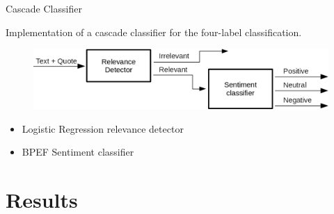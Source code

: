 \documentclass{beamer}
\begin{document}
	\begin{frame}{Cascade Classifier}
		
		Implementation of a cascade classifier for the four-label classification.
		
		\begin{figure}
				\centering
				\includegraphics[width=\linewidth]{figures/blocks_cascade.png}
		\end{figure}
	
		\begin{itemize}
			\item Logistic Regression relevance detector
			\item BPEF Sentiment classifier
		\end{itemize}
		
		
	\end{frame}



	\section{Results}
	
%			
%			
%			
\end{document}
